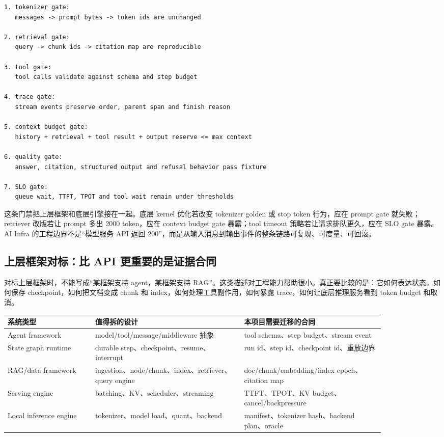 \begin{lstlisting}[numbers=none,caption={上层编排 release gate}]
1. tokenizer gate:
   messages -> prompt bytes -> token ids are unchanged

2. retrieval gate:
   query -> chunk ids -> citation map are reproducible

3. tool gate:
   tool calls validate against schema and step budget

4. trace gate:
   stream events preserve order, parent span and finish reason

5. context budget gate:
   history + retrieval + tool result + output reserve <= max context

6. quality gate:
   answer, citation, structured output and refusal behavior pass fixture

7. SLO gate:
   queue wait, TTFT, TPOT and tool wait remain under thresholds
\end{lstlisting}

这条门禁把上层框架和底层引擎接在一起。底层 kernel 优化若改变 tokenizer golden 或 stop token 行为，应在 prompt gate 就失败；retriever 改版若让 prompt 多出 2000 token，应在 context budget gate 暴露；tool timeout 策略若让请求排队更久，应在 SLO gate 暴露。AI Infra 的工程边界不是“模型服务 API 返回 200”，而是从输入消息到输出事件的整条链路可复现、可度量、可回滚。

\subsection{上层框架对标：比 API 更重要的是证据合同}

对标上层框架时，不能写成“某框架支持 agent，某框架支持 RAG”。这类描述对工程能力帮助很小。真正要比较的是：它如何表达状态，如何保存 checkpoint，如何把文档变成 chunk 和 index，如何处理工具副作用，如何暴露 trace，如何让底层推理服务看到 token budget 和取消。

\begin{center}
\small
\begin{tabular}{p{0.20\linewidth}p{0.34\linewidth}p{0.32\linewidth}}
\toprule
系统类型 & 值得拆的设计 & 本项目需要迁移的合同 \\
\midrule
Agent framework & model/tool/message/middleware 抽象 & tool schema、step budget、stream event \\
State graph runtime & durable step、checkpoint、resume、interrupt & run id、step id、checkpoint id、重放边界 \\
RAG/data framework & ingestion、node/chunk、index、retriever、query engine & doc/chunk/embedding/index epoch、citation map \\
Serving engine & batching、KV、scheduler、streaming & TTFT、TPOT、KV budget、cancel/backpressure \\
Local inference engine & tokenizer、model load、quant、backend & manifest、tokenizer hash、backend plan、oracle \\
\bottomrule
\end{tabular}
\end{center}

